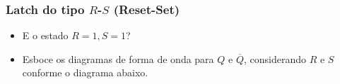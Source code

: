 \documentclass{beamer}
\newcommand{\Not}[1]{\overline{#1}}
\begin{document}
\begin{frame}
\frametitle{Latch do tipo $R$-$S$ (Reset-Set)}

\begin{itemize}
\item E o estado $R = 1, S = 1$?
\pause
\item Esboce os diagramas de forma de onda para $Q$ e $\Not{Q}$,
      considerando $R$ e $S$ conforme o diagrama abaixo.
\begin{center}
%
%
%

\end{center}
\end{itemize}
\end{frame}
\end{document}
